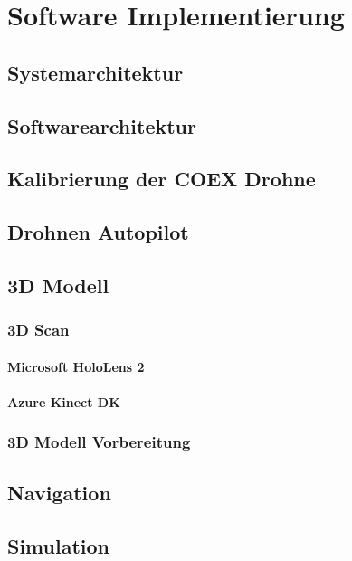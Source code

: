 \chapter{Software Implementierung}

\section{Systemarchitektur}

\section{Softwarearchitektur}

\section{Kalibrierung der COEX Drohne}

\section{Drohnen Autopilot}

\section{3D Modell}

    \subsection{3D Scan}

        \subsubsection{Microsoft HoloLens 2}

        \subsubsection{Azure Kinect \ac{DK}}

    \subsection{3D Modell Vorbereitung}

\section{Navigation}

\section{Simulation}

